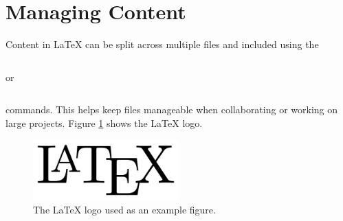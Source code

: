 \section{Managing Content}
Content in LaTeX can be split across multiple files and included using the

\begin{verbatim}\end{verbatim}
or
\begin{verbatim}\end{verbatim}

commands. This helps keep files manageable when collaborating or working on large projects. Figure \ref{fig:latex-logo} shows the LaTeX logo.

\begin{figure}[h]
    \centering
    \includegraphics[width=0.5\textwidth]{figs/logo.png}
    \caption{The LaTeX logo used as an example figure.}
    \label{fig:latex-logo}
\end{figure}

